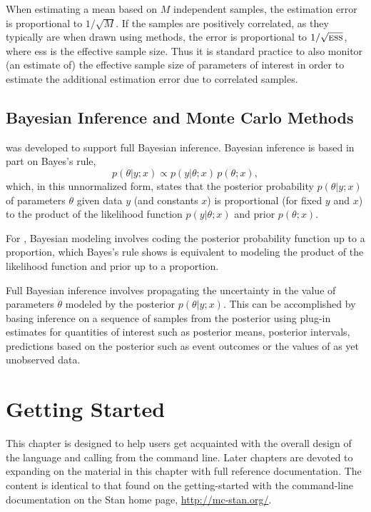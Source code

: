 When estimating a mean based on $M$ independent samples, the
estimation error is proportional to $1/\sqrt{M}$.  If the samples are
positively correlated, as they typically are when drawn using \MCMC
methods, the error is proportional to $1/\sqrt{\mbox{\sc ess}}$, where
{\sc ess} is the effective sample size.  Thus it is standard practice
to also monitor (an estimate of) the effective sample size of
parameters of interest in order to estimate the additional estimation
error due to correlated samples.





\section{Bayesian Inference and Monte Carlo Methods}

\Stan was developed to support full Bayesian inference.  Bayesian
inference is based in part on Bayes's rule,
\[
p(\theta|y;x) \propto p(y|\theta;x) \, p(\theta;x),
\]
which, in this unnormalized form, states that the posterior
probability $p(\theta|y;x)$ of parameters $\theta$ given data $y$ (and
constants $x$) is proportional (for fixed $y$ and $x$) to the
product of the likelihood function $p(y|\theta;x)$ and prior
$p(\theta;x)$.

For \Stan, Bayesian modeling involves coding the posterior probability
function up to a proportion, which Bayes's rule shows is equivalent to
modeling the product of the likelihood function and prior up to a
proportion.

Full Bayesian inference involves propagating the uncertainty in the
value of parameters $\theta$ modeled by the posterior $p(\theta|y;x)$.
This can be accomplished by basing inference on a sequence of samples
from the posterior using plug-in estimates for quantities of interest
such as posterior means, posterior intervals, predictions based on the
posterior such as event outcomes or the values of as yet unobserved
data.



\chapter{Getting Started}

\noindent
This chapter is designed to help users get acquainted with the overall
design of the \Stan language and calling \Stan from the command line.
Later chapters are devoted to expanding on the material in this
chapter with full reference documentation.  The content is identical
to that found on the getting-started with the command-line
documentation on the Stan home page, \url{http://mc-stan.org/}.

